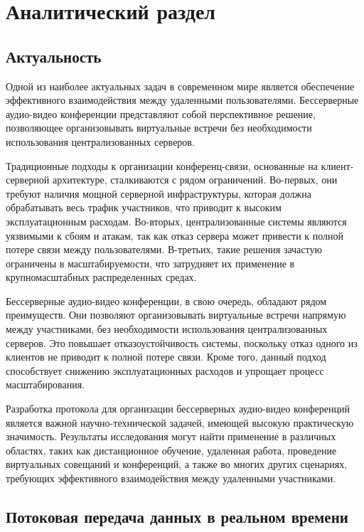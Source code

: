 \chapter{Аналитический раздел}

\section{Актуальность}

Одной из наиболее актуальных задач в современном мире является обеспечение эффективного взаимодействия между удаленными пользователями.
Бессерверные аудио-видео конференции представляют собой перспективное решение, позволяющее организовывать виртуальные встречи без необходимости использования централизованных серверов.

Традиционные подходы к организации конференц-связи, основанные на клиент-серверной архитектуре, сталкиваются с рядом ограничений.
Во-первых, они требуют наличия мощной серверной инфраструктуры, которая должна обрабатывать весь трафик участников, что приводит к высоким эксплуатационным расходам.
Во-вторых, централизованные системы являются уязвимыми к сбоям и атакам, так как отказ сервера может привести к полной потере связи между пользователями.
В-третьих, такие решения зачастую ограничены в масштабируемости, что затрудняет их применение в крупномасштабных распределенных средах.

Бессерверные аудио-видео конференции, в свою очередь, обладают рядом преимуществ.
Они позволяют организовывать виртуальные встречи напрямую между участниками, без необходимости использования централизованных серверов.
Это повышает отказоустойчивость системы, поскольку отказ одного из клиентов не приводит к полной потере связи.
Кроме того, данный подход способствует снижению эксплуатационных расходов и упрощает процесс масштабирования.

Разработка протокола для организации бессерверных аудио-видео конференций является важной научно-технической задачей, имеющей высокую практическую значимость.
Результаты исследования могут найти применение в различных областях, таких как дистанционное обучение, удаленная работа, проведение виртуальных совещаний и конференций, а также во многих других сценариях, требующих эффективного взаимодействия между удаленными участниками.

\section{Потоковая передача данных в реальном времени}

